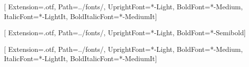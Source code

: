 
\newcommand{\sourcecodeprodir}[0]{../fonts/}
\newcommand{\sourceserifprodir}[0]{../fonts/}

\newcommand{\codepromd}[0]{Light}
\newcommand{\codeprobf}[0]{Medium}
\newcommand{\codeproit}[0]{LightIt}
\newcommand{\codeprobi}[0]{MediumIt}
\newcommand{\serifpromd}[0]{Light}
\newcommand{\serifprobf}[0]{Semibold}

\newfontfamily{}[
  Extension=.otf,
  Path=\sourcecodeprodir,
  UprightFont=*-\codepromd,
  BoldFont=*-\codeprobf,
  ItalicFont=*-\codeproit,
  BoldItalicFont=*-\codeprobi]

\newfontfamily{}[
  Extension=.otf,
  Path=\sourceserifprodir,
  UprightFont=*-\serifpromd,
  BoldFont=*-\serifprobf]

\newcommand{\serif}[0]{\SourceSerifPro}
 
\setmonofont{SourceCodePro}[
  Extension=.otf,
  Path=\sourcecodeprodir,
  UprightFont=*-\codepromd,
  BoldFont=*-\codeprobf,
  ItalicFont=*-\codeproit,
  BoldItalicFont=*-\codeprobi]
